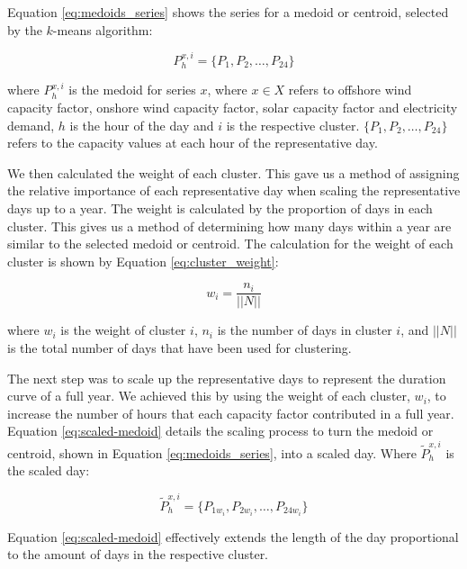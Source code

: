 Equation \ref{eq:medoids_series} shows the series for a medoid or centroid, selected by the $k$-means algorithm:

\begin{equation}
\label{eq:medoids_series}
P^{x,i}_{h}=\{P_1, P_2, \ldots, P_{24}\}
\end{equation}

\noindent where $P^{x,i}_{h}$ is the medoid for series $x$, where $x\in X$ refers to offshore wind capacity factor, onshore wind capacity factor, solar capacity factor and electricity demand, $h$ is the hour of the day and $i$ is the respective cluster. $\{P_1, P_2, \ldots , P_{24}\}$ refers to the capacity values at each hour of the representative day.

We then calculated the weight of each cluster. This gave us a method of assigning the relative importance of each representative day when scaling the representative days up to a year. The weight is calculated by the proportion of days in each cluster. This gives us a method of determining how many days within a year are similar to the selected medoid or centroid. The calculation for the weight of each cluster is shown by Equation \ref{eq:cluster_weight}:

\begin{equation}
\label{eq:cluster_weight}
w_i = \frac{n_i}{||N||} 
\end{equation} 

\noindent where $w_i$ is the weight of cluster $i$, $n_i$ is the number of days in cluster $i$, and $||N||$ is the total number of days that have been used for clustering. 


The next step was to scale up the representative days to represent the duration curve of a full year. We achieved this by using the weight of each cluster, $w_i$, to increase the number of hours that each capacity factor contributed in a full year. Equation \ref{eq:scaled-medoid} details the scaling process to turn the medoid or centroid, shown in Equation \ref{eq:medoids_series}, into a scaled day. Where $\widetilde{P}^{x,i}_{h}$ is the scaled day:

\begin{equation}
\label{eq:scaled-medoid}
\widetilde{P}^{x,i}_{h} =  \{P_{1w_i}, P_{2w_i}, \ldots, P_{24w_i}\}
\end{equation} 

\noindent Equation \ref{eq:scaled-medoid} effectively extends the length of the day proportional to the amount of days in the respective cluster.


